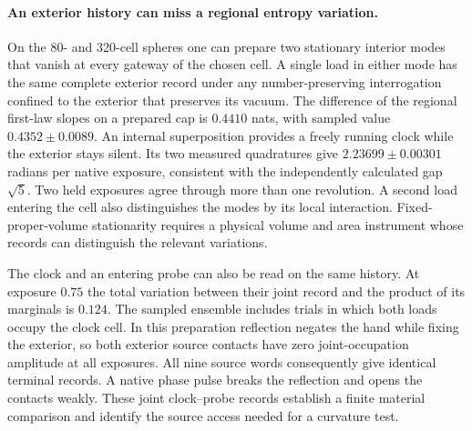 \documentclass[11pt]{article}
\begin{document}
\paragraph{An exterior history can miss a regional entropy variation.}
On the 80- and 320-cell spheres one can prepare two stationary interior
modes that vanish at every gateway of the chosen cell. A single load
in either mode has the same complete exterior record under any
number-preserving interrogation confined to the exterior that preserves
its vacuum. The difference of the regional first-law slopes on a prepared
cap is $0.4410$ nats, with sampled value $0.4352\pm0.0089$.
An internal superposition provides a freely running clock while the
exterior stays silent. Its two measured quadratures give
$2.23699\pm0.00301$ radians per native exposure, consistent with
the independently calculated gap $\sqrt5$. Two held exposures agree
through more than one revolution. A second load entering the cell also
distinguishes the modes by its local interaction. Fixed-proper-volume
stationarity requires a physical
volume and area instrument whose records can distinguish the relevant
variations.

The clock and an entering probe can also be read on the same history.
At exposure $0.75$ the total variation between their joint record and
the product of its marginals is $0.124$. The sampled ensemble includes
trials in which both loads occupy the clock cell. In this preparation
reflection negates the hand while fixing the exterior, so both exterior
source contacts have zero joint-occupation amplitude at all exposures.
All nine source words consequently give identical terminal records.
A native phase pulse breaks the reflection and opens the contacts
weakly. These joint clock--probe records establish a finite material
comparison and identify the source access needed for a curvature test.
\end{document}
